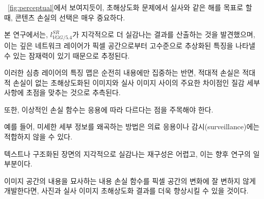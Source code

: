 \documentclass[10pt,twocolumn,letterpaper]{article}
\newcommand{\kor}[1]{#1}
\newcommand{\eng}[1]{}
\newcommand{\summary}[1]{}
\begin{document}
\summary{
SRGAN은 PSNR과 SSIM보다 인간 지각 체계와 관련된 평가 지표에서 우수한 성능을 보였으며, ResNet 설계는 심층 네트워크 성능에 큰 영향을 미쳤음. 심층 네트워크는 더 나은 성능을 제공하지만 훈련 및 테스트 시간이 더 오래 걸리며, 고주파 인공물이 발생하여 훈련이 어렵다는 것을 발견함.
}

\eng{
Of particular importance when aiming for photo-realistic solutions to the \ac{SR} problem is the choice of the content loss as illustrated in \figurename~\ref{fig:perceptual}.
}\kor{
\figurename~\ref{fig:perceptual}에서 보여지듯이, \ac{초해상도화} 문제에서 실사와 같은 해를 목표로 할 때, 콘텐츠 손실의 선택은 매우 중요하다.
} \eng{
In this work, we found $l^{SR}_{VGG/5.4}$ to yield the perceptually most convincing results, which we attribute to the potential of deeper network layers to represent features of higher abstraction \cite{zeiler2014visualizing,Yosinski2015,Mahendran2016} away from pixel space.
}\kor{
본 연구에서는, $l^{SR}_{VGG/5.4}$가 지각적으로 더 실감나는 결과를 산출하는 것을 발견했으며,
이는 깊은 네트워크 레이어가 픽셀 공간으로부터 고수준으로 추상화된 특징\cite{zeiler2014visualizing,Yosinski2015,Mahendran2016}을 나타낼 수 있는 잠재력이 있기 때문으로 추정된다.
} \eng{
We speculate that feature maps of these deeper layers focus purely on the content while leaving the adversarial loss focusing on texture details which are the main difference between the super-resolved images without the adversarial loss and photo-realistic images.
}\kor{
이러한 심층 레이어의 특징 맵은 순전히 내용에만 집중하는 반면, 적대적 손실은 적대적 손실이 없는 초해상도화된 이미지와 실사 이미지 사이의 주요한 차이점인 질감 세부 사항에 초점을 맞추는 것으로 추측된다.
}
\eng{
We also note that the ideal loss function depends on the application.
}\kor{
또한, 이상적인 손실 함수는 응용에 따라 다르다는 점을 주목해야 한다.
} \eng{
For example, approaches that hallucinate finer detail might be less suited for medical applications or surveillance.
}\kor{
예를 들어, 미세한 세부 정보를 왜곡하는 방법은 의료 응용이나 감시(surveillance)에는 적합하지 않을 수 있다.
} \eng{
The perceptually convincing reconstruction of text or structured scenes \cite{Huang15selfexemplars} is challenging and part of future work.
}\kor{
텍스트나 구조화된 장면의 지각적으로 실감나는 재구성\cite{Huang15selfexemplars}은 어렵고, 이는 향후 연구의 일부분이다.
}
\eng{
The development of content loss functions that describe image spatial content, but more invariant to changes in pixel space will further improve photo-realistic image \ac{SR} results.
}\kor{
이미지 공간의 내용을 묘사하는 내용 손실 함수를 픽셀 공간의 변화에 잘 변하지 않게 개발한다면, 사진과 실사 이미지 \ac{초해상도화} 결과를 더욱 향상시킬 수 있을 것이다.
}
\end{document}
